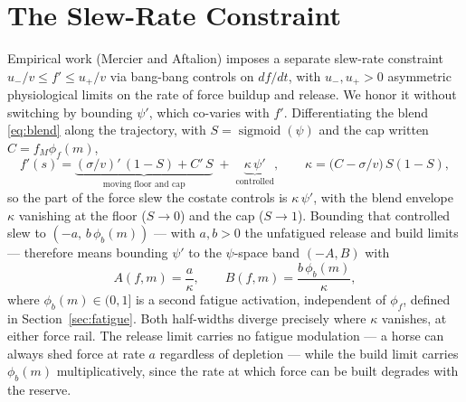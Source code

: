 \documentclass[11pt]{article}
\DeclareMathOperator{\sigmoid}{sigmoid}
\begin{document}
\section{The Slew-Rate Constraint}\label{sec:slew}

Empirical work (Mercier and Aftalion) imposes a separate slew-rate constraint $u_-/v \leq f' \leq u_+/v$ via bang-bang controls on $df/dt$, with $u_-, u_+ > 0$ asymmetric physiological limits on the rate of force buildup and release. We honor it without switching by bounding $\psi'$, which co-varies with $f'$. Differentiating the blend \eqref{eq:blend} along the trajectory, with $S = \sigmoid(\psi)$ and the cap written $C = f_M \phi_f(m)$,
\begin{equation}\label{eq:slew-coupling}
f'(s) = \underbrace{(\sigma/v)'\,(1 - S) + C'\, S}_{\text{moving floor and cap}} \;+\; \underbrace{\kappa\, \psi'}_{\text{controlled}}, \qquad \kappa = \bigl(C - \sigma/v\bigr)\, S(1 - S),
\end{equation}
so the part of the force slew the costate controls is $\kappa\,\psi'$, with the blend envelope $\kappa$ vanishing at the floor ($S \to 0$) and the cap ($S \to 1$). Bounding that controlled slew to $(-a,\, b\,\phi_b(m))$ --- with $a, b > 0$ the unfatigued release and build limits --- therefore means bounding $\psi'$ to the $\psi$-space band $(-A, B)$ with
\begin{equation}\label{eq:slew-band}
A(f, m) = \frac{a}{\kappa}, \qquad B(f, m) = \frac{b\, \phi_b(m)}{\kappa},
\end{equation}
where $\phi_b(m) \in (0, 1]$ is a second fatigue activation, independent of $\phi_f$, defined in Section~\ref{sec:fatigue}. Both half-widths diverge precisely where $\kappa$ vanishes, at either force rail. The release limit carries no fatigue modulation --- a horse can always shed force at rate $a$ regardless of depletion --- while the build limit carries $\phi_b(m)$ multiplicatively, since the rate at which force can be built degrades with the reserve.
\end{document}

